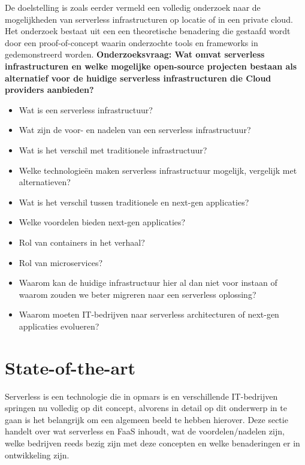\newline
\newline
De doelstelling is zoals eerder vermeld een volledig onderzoek naar de mogelijkheden van serverless infrastructuren op locatie of in een private cloud. Het onderzoek bestaat uit een een theoretische benadering die gestaafd wordt door een proof-of-concept waarin onderzochte tools en frameworks in gedemonstreerd worden.
\newline
\newline
\textbf{Onderzoeksvraag: 
    Wat omvat serverless infrastructuren en welke mogelijke open-source projecten bestaan als alternatief voor de huidige serverless infrastructuren die Cloud providers aanbieden?}
\begin{itemize}
  \item Wat is een serverless infrastructuur?
  \item Wat zijn de voor- en nadelen van een serverless infrastructuur?
  \item Wat is het verschil met traditionele infrastructuur?
  \item Welke technologieën maken serverless infrastructuur mogelijk, vergelijk met alternatieven?
  \item Wat is het verschil tussen traditionele en next-gen applicaties?
  \item Welke voordelen bieden next-gen applicaties?
  \item Rol van containers in het verhaal?
  \item Rol van microservices?
  \item Waarom kan de huidige infrastructuur hier al dan niet voor instaan of waarom zouden we beter migreren naar een serverless oplossing?
  \item Waarom moeten IT-bedrijven naar serverless architecturen of next-gen applicaties evolueren?
\end{itemize}


\section{State-of-the-art}
\label{sec:state-of-the-art}

Serverless is een technologie die in opmars is en verschillende IT-bedrijven springen nu volledig op dit concept, alvorens in detail op dit onderwerp in te gaan is het belangrijk om een algemeen beeld te hebben hierover. Deze sectie handelt over wat serverless en FaaS inhoudt, wat de voordelen/nadelen zijn, welke bedrijven reeds bezig zijn met deze concepten en welke benaderingen er in ontwikkeling zijn.

